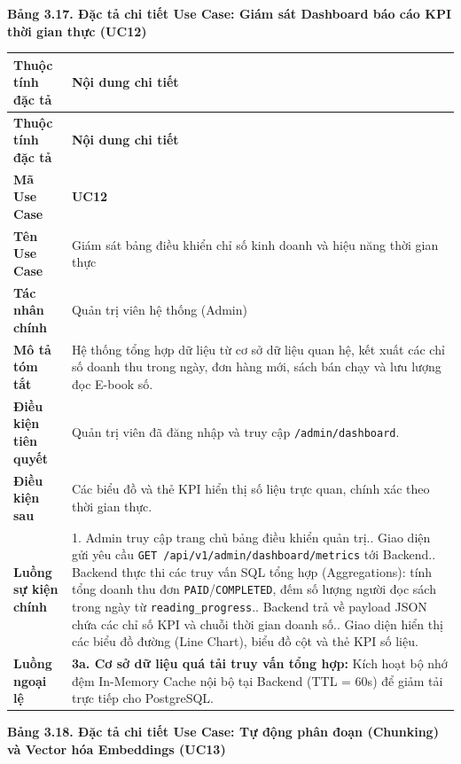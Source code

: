 \documentclass[11pt, a4paper]{report}
\begin{document}
\vspace{0.3cm}
\noindent\textbf{Bảng 3.17. Đặc tả chi tiết Use Case: Giám sát Dashboard báo cáo KPI thời gian thực (UC12)}

\begin{longtable}{p{3.8cm} p{10.5cm}}
\toprule
\textbf{Thuộc tính đặc tả} & \textbf{Nội dung chi tiết} \\
\midrule
\endfirsthead
\toprule
\textbf{Thuộc tính đặc tả} & \textbf{Nội dung chi tiết} \\
\midrule
\endhead
\bottomrule
\endfoot
\textbf{Mã Use Case} & \textbf{UC12} \\
\midrule
\textbf{Tên Use Case} & Giám sát bảng điều khiển chỉ số kinh doanh và hiệu năng thời gian thực \\
\midrule
\textbf{Tác nhân chính} & Quản trị viên hệ thống (Admin) \\
\midrule
\textbf{Mô tả tóm tắt} & Hệ thống tổng hợp dữ liệu từ cơ sở dữ liệu quan hệ, kết xuất các chỉ số doanh thu trong ngày, đơn hàng mới, sách bán chạy và lưu lượng đọc E-book số. \\
\midrule
\textbf{Điều kiện tiên quyết} & Quản trị viên đã đăng nhập và truy cập \texttt{/admin/dashboard}. \\
\midrule
\textbf{Điều kiện sau} & Các biểu đồ và thẻ KPI hiển thị số liệu trực quan, chính xác theo thời gian thực. \\
\midrule
\textbf{Luồng sự kiện chính} & 
1. Admin truy cập trang chủ bảng điều khiển quản trị.\newline
2. Giao diện gửi yêu cầu \texttt{GET /api/v1/admin/dashboard/metrics} tới Backend.\newline
3. Backend thực thi các truy vấn SQL tổng hợp (Aggregations): tính tổng doanh thu đơn \texttt{PAID}/\texttt{COMPLETED}, đếm số lượng người đọc sách trong ngày từ \texttt{reading\_progress}.\newline
4. Backend trả về payload JSON chứa các chỉ số KPI và chuỗi thời gian doanh số.\newline
5. Giao diện hiển thị các biểu đồ đường (Line Chart), biểu đồ cột và thẻ KPI số liệu. \\
\midrule
\textbf{Luồng ngoại lệ} & 
\textbf{3a. Cơ sở dữ liệu quá tải truy vấn tổng hợp:} Kích hoạt bộ nhớ đệm In-Memory Cache nội bộ tại Backend (TTL = 60s) để giảm tải trực tiếp cho PostgreSQL. \\
\bottomrule
\end{longtable}

\vspace{0.3cm}
\noindent\textbf{Bảng 3.18. Đặc tả chi tiết Use Case: Tự động phân đoạn (Chunking) và Vector hóa Embeddings (UC13)}
\end{document}
